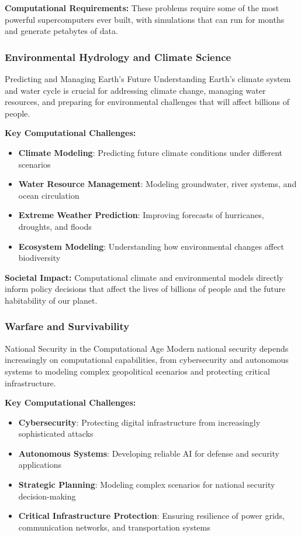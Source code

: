 \textbf{Computational Requirements:}
These problems require some of the most powerful supercomputers ever built, with simulations that can run for months and generate petabytes of data.

\subsubsection{Environmental Hydrology and Climate Science}

\begin{highlightbox}{Predicting and Managing Earth's Future}
Understanding Earth's climate system and water cycle is crucial for addressing climate change, managing water resources, and preparing for environmental challenges that will affect billions of people.
\end{highlightbox}

\textbf{Key Computational Challenges:}
\begin{itemize}
    \item \textbf{Climate Modeling}: Predicting future climate conditions under different scenarios
    \item \textbf{Water Resource Management}: Modeling groundwater, river systems, and ocean circulation
    \item \textbf{Extreme Weather Prediction}: Improving forecasts of hurricanes, droughts, and floods
    \item \textbf{Ecosystem Modeling}: Understanding how environmental changes affect biodiversity
\end{itemize}

\textbf{Societal Impact:}
Computational climate and environmental models directly inform policy decisions that affect the lives of billions of people and the future habitability of our planet.

\subsubsection{Warfare and Survivability}

\begin{highlightbox}{National Security in the Computational Age}
Modern national security depends increasingly on computational capabilities, from cybersecurity and autonomous systems to modeling complex geopolitical scenarios and protecting critical infrastructure.
\end{highlightbox}

\textbf{Key Computational Challenges:}
\begin{itemize}
    \item \textbf{Cybersecurity}: Protecting digital infrastructure from increasingly sophisticated attacks
    \item \textbf{Autonomous Systems}: Developing reliable AI for defense and security applications
    \item \textbf{Strategic Planning}: Modeling complex scenarios for national security decision-making
    \item \textbf{Critical Infrastructure Protection}: Ensuring resilience of power grids, communication networks, and transportation systems
\end{itemize}


